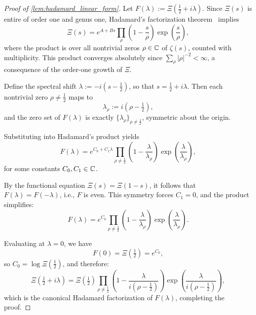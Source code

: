 \begin{proof}[Proof of \cref{lem:hadamard_linear_form}]
Let \( F(\lambda) := \Xi\left( \tfrac{1}{2} + i\lambda \right) \). Since \( \Xi(s) \) is entire of order one and genus one, Hadamard’s factorization theorem~\cite[Thm.~3.7.1]{Levin1996EntireLectures} implies
\[
\Xi(s) = e^{A + B s} \prod_{\rho} \left( 1 - \frac{s}{\rho} \right) \exp\left( \frac{s}{\rho} \right),
\]
where the product is over all nontrivial zeros \( \rho \in \mathbb{C} \) of \( \zeta(s) \), counted with multiplicity. This product converges absolutely since \( \sum_\rho |\rho|^{-2} < \infty \), a consequence of the order-one growth of \( \Xi \).

\smallskip
Define the spectral shift \( \lambda := -i(s - \tfrac{1}{2}) \), so that \( s = \tfrac{1}{2} + i\lambda \). Then each nontrivial zero \( \rho \ne \tfrac{1}{2} \) maps to
\[
\lambda_\rho := i(\rho - \tfrac{1}{2}),
\]
and the zero set of \( F(\lambda) \) is exactly \( \{ \lambda_\rho \}_{\rho \ne \frac{1}{2}} \), symmetric about the origin.

Substituting into Hadamard’s product yields
\[
F(\lambda) = e^{C_0 + C_1 \lambda} \prod_{\rho \ne \frac{1}{2}} \left( 1 - \frac{\lambda}{\lambda_\rho} \right) \exp\left( \frac{\lambda}{\lambda_\rho} \right),
\]
for some constants \( C_0, C_1 \in \mathbb{C} \).

\smallskip
By the functional equation \( \Xi(s) = \Xi(1 - s) \), it follows that \( F(\lambda) = F(-\lambda) \), i.e., \( F \) is even. This symmetry forces \( C_1 = 0 \), and the product simplifies:
\[
F(\lambda) = e^{C_0} \prod_{\rho \ne \frac{1}{2}} \left( 1 - \frac{\lambda}{\lambda_\rho} \right) \exp\left( \frac{\lambda}{\lambda_\rho} \right).
\]

Evaluating at \( \lambda = 0 \), we have
\[
F(0) = \Xi\left( \tfrac{1}{2} \right) = e^{C_0},
\]
so \( C_0 = \log \Xi\left( \tfrac{1}{2} \right) \), and therefore:
\[
\Xi\left( \tfrac{1}{2} + i\lambda \right)
= \Xi\left( \tfrac{1}{2} \right) \prod_{\rho \ne \frac{1}{2}} \left( 1 - \frac{\lambda}{i(\rho - \tfrac{1}{2})} \right) \exp\left( \frac{\lambda}{i(\rho - \tfrac{1}{2})} \right),
\]
which is the canonical Hadamard factorization of \( F(\lambda) \), completing the proof.
\end{proof}
